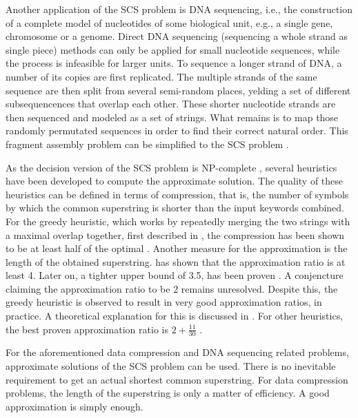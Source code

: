\documentclass[english,twoside,censored,csm,algorithms-track-2020]{HYthesisML}
\theoremstyle{plain}
\theoremstyle{definition}
\begin{document}
Another application of the SCS problem is DNA sequencing, i.e., the construction of a complete
model of nucleotides of some biological unit, e.g., a single gene, chromosome or a genome. 
Direct DNA sequencing (sequencing a whole strand as single piece) methods can only be applied for
small nucleotide sequences,
while the process is infeasible for larger units. To sequence a longer strand of DNA,
a number of its copies are
first replicated. The multiple strands of the same sequence are then split from several semi-random
places, yelding a set of different subsequencences that overlap each other. These shorter nucleotide
strands are then sequenced and modeled as a set of strings. What remains is to map
those randomly permutated sequences in order to find their correct natural order.
This fragment assembly problem can be simplified to the SCS problem \citep{Peltola83}.

As the decision version of the SCS problem is \textsc{NP}-complete \citep{Gallant80},
several heuristics have been
developed to compute the approximate solution.
The quality of these heuristics
can be defined in terms of compression, that is, the number of symbols by which the common superstring
is shorter than the input keywords combined. For the greedy heuristic,
which works by repeatedly merging the two strings with a maximal overlap together, first
described in \citep{Gallant82}, the compression has been shown to be at least half of the optimal
\citep{Tarhio88}. Another measure for the approximation is the length of the
obtained superstring. \citep{Blum94} has shown that the approximation ratio is at least 4.
Later on, a tighter upper bound of 3.5, has been proven \citep{Kaplan05}.
A conjencture \citep{Tarhio88} claiming the approximation ratio to be 2 remains unresolved.
Despite this,
the greedy heuristic is observed to result in very good approximation
ratios, in practice. A theoretical explanation for this is discussed in \citep{Ma08}.
For other heuristics,
the best proven approximation ratio is $2 + \frac{11}{30}$ \citep{Paluch14}.

For the aforementioned data compression and DNA sequencing related problems,
approximate solutions of the SCS problem can be used. There is no inevitable requirement
to get an actual shortest common superstring. For data compression problems, the length of
the superstring is only a matter of efficiency. A good approximation is simply enough. 
\end{document}
